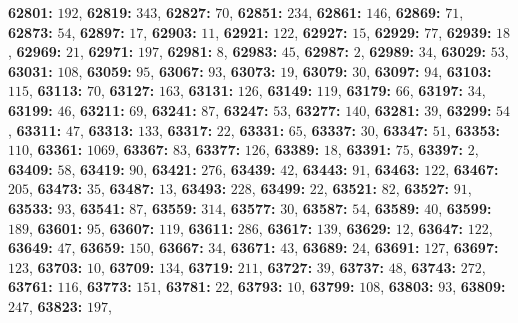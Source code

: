 \textsf{\bfseries 62801:} $192$, \textsf{\bfseries 62819:} $343$, \textsf{\bfseries 62827:} $70$, \textsf{\bfseries 62851:} $234$, \textsf{\bfseries 62861:} $146$, \textsf{\bfseries 62869:} $71$, \textsf{\bfseries 62873:} $54$, \textsf{\bfseries 62897:} $17$, \textsf{\bfseries 62903:} $11$, \textsf{\bfseries 62921:} $122$, \textsf{\bfseries 62927:} $15$, \textsf{\bfseries 62929:} $77$, \textsf{\bfseries 62939:} $18$, \textsf{\bfseries 62969:} $21$, \textsf{\bfseries 62971:} $197$, \textsf{\bfseries 62981:} $8$, \textsf{\bfseries 62983:} $45$, \textsf{\bfseries 62987:} $2$, \textsf{\bfseries 62989:} $34$, \textsf{\bfseries 63029:} $53$, \textsf{\bfseries 63031:} $108$, \textsf{\bfseries 63059:} $95$, \textsf{\bfseries 63067:} $93$, \textsf{\bfseries 63073:} $19$, \textsf{\bfseries 63079:} $30$, \textsf{\bfseries 63097:} $94$, \textsf{\bfseries 63103:} $115$, \textsf{\bfseries 63113:} $70$, \textsf{\bfseries 63127:} $163$, \textsf{\bfseries 63131:} $126$, \textsf{\bfseries 63149:} $119$, \textsf{\bfseries 63179:} $66$, \textsf{\bfseries 63197:} $34$, \textsf{\bfseries 63199:} $46$, \textsf{\bfseries 63211:} $69$, \textsf{\bfseries 63241:} $87$, \textsf{\bfseries 63247:} $53$, \textsf{\bfseries 63277:} $140$, \textsf{\bfseries 63281:} $39$, \textsf{\bfseries 63299:} $54$, \textsf{\bfseries 63311:} $47$, \textsf{\bfseries 63313:} $133$, \textsf{\bfseries 63317:} $22$, \textsf{\bfseries 63331:} $65$, \textsf{\bfseries 63337:} $30$, \textsf{\bfseries 63347:} $51$, \textsf{\bfseries 63353:} $110$, \textsf{\bfseries 63361:} $1069$, \textsf{\bfseries 63367:} $83$, \textsf{\bfseries 63377:} $126$, \textsf{\bfseries 63389:} $18$, \textsf{\bfseries 63391:} $75$, \textsf{\bfseries 63397:} $2$, \textsf{\bfseries 63409:} $58$, \textsf{\bfseries 63419:} $90$, \textsf{\bfseries 63421:} $276$, \textsf{\bfseries 63439:} $42$, \textsf{\bfseries 63443:} $91$, \textsf{\bfseries 63463:} $122$, \textsf{\bfseries 63467:} $205$, \textsf{\bfseries 63473:} $35$, \textsf{\bfseries 63487:} $13$, \textsf{\bfseries 63493:} $228$, \textsf{\bfseries 63499:} $22$, \textsf{\bfseries 63521:} $82$, \textsf{\bfseries 63527:} $91$, \textsf{\bfseries 63533:} $93$, \textsf{\bfseries 63541:} $87$, \textsf{\bfseries 63559:} $314$, \textsf{\bfseries 63577:} $30$, \textsf{\bfseries 63587:} $54$, \textsf{\bfseries 63589:} $40$, \textsf{\bfseries 63599:} $189$, \textsf{\bfseries 63601:} $95$, \textsf{\bfseries 63607:} $119$, \textsf{\bfseries 63611:} $286$, \textsf{\bfseries 63617:} $139$, \textsf{\bfseries 63629:} $12$, \textsf{\bfseries 63647:} $122$, \textsf{\bfseries 63649:} $47$, \textsf{\bfseries 63659:} $150$, \textsf{\bfseries 63667:} $34$, \textsf{\bfseries 63671:} $43$, \textsf{\bfseries 63689:} $24$, \textsf{\bfseries 63691:} $127$, \textsf{\bfseries 63697:} $123$, \textsf{\bfseries 63703:} $10$, \textsf{\bfseries 63709:} $134$, \textsf{\bfseries 63719:} $211$, \textsf{\bfseries 63727:} $39$, \textsf{\bfseries 63737:} $48$, \textsf{\bfseries 63743:} $272$, \textsf{\bfseries 63761:} $116$, \textsf{\bfseries 63773:} $151$, \textsf{\bfseries 63781:} $22$, \textsf{\bfseries 63793:} $10$, \textsf{\bfseries 63799:} $108$, \textsf{\bfseries 63803:} $93$, \textsf{\bfseries 63809:} $247$, \textsf{\bfseries 63823:} $197$, 
